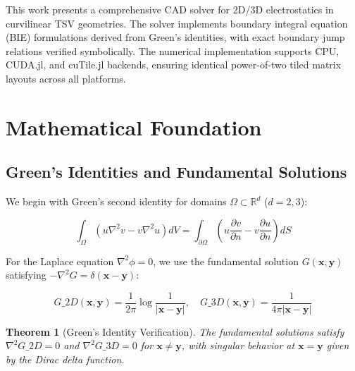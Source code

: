 \documentclass[12pt]{article}
\newtheorem{theorem}{Theorem}
\theoremstyle{definition}
\begin{document}
This work presents a comprehensive CAD solver for 2D/3D electrostatics in curvilinear TSV geometries. The solver implements boundary integral equation (BIE) formulations derived from Green's identities, with exact boundary jump relations verified symbolically. The numerical implementation supports CPU, CUDA.jl, and cuTile.jl backends, ensuring identical power-of-two tiled matrix layouts across all platforms.

\section{Mathematical Foundation}

\subsection{Green's Identities and Fundamental Solutions}

We begin with Green's second identity for domains $\Omega \subset \mathbb{R}^d$ ($d = 2, 3$):

\begin{equation}
\int_\Omega \left(u \nabla^2 v - v \nabla^2 u\right) dV = \int_{\partial \Omega} \left(u \frac{\partial v}{\partial n} - v \frac{\partial u}{\partial n}\right) dS
\end{equation}

For the Laplace equation $\nabla^2 \phi = 0$, we use the fundamental solution $G(\mathbf{x}, \mathbf{y})$ satisfying $-\nabla^2 G = \delta(\mathbf{x} - \mathbf{y})$:

\begin{equation}
G\_2D(\mathbf{x}, \mathbf{y}) = \frac{1}{2\pi} \log \frac{1}{|\mathbf{x} - \mathbf{y}|}, \quad
G\_3D(\mathbf{x}, \mathbf{y}) = \frac{1}{4\pi |\mathbf{x} - \mathbf{y}|}
\end{equation}

\begin{theorem}[Green's Identity Verification]
The fundamental solutions satisfy $\nabla^2 G\_2D = 0$ and $\nabla^2 G\_3D = 0$ for $\mathbf{x} \neq \mathbf{y}$, with singular behavior at $\mathbf{x} = \mathbf{y}$ given by the Dirac delta function.
\end{theorem}
\end{document}
